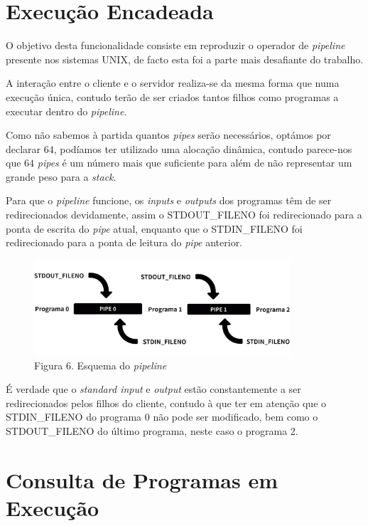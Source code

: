 \documentclass[12pt,a4paper]{report}
\begin{document}
    \section{Execução Encadeada}

        O objetivo desta funcionalidade consiste em reproduzir o operador de \textit{pipeline} presente nos sistemas UNIX, de facto esta foi a parte mais desafiante do trabalho.

        A interação entre o cliente e o servidor realiza-se da mesma forma que numa execução única, contudo terão de ser criados tantos filhos como programas a executar dentro do \textit{pipeline}.

        Como não sabemos à partida quantos \textit{pipes} serão necessários, optámos por declarar $64$, podíamos ter utilizado uma alocação dinâmica, contudo parece-nos que $64$ \textit{pipes} é um número mais que suficiente para além de não representar um grande peso para a \textit{stack}.

        Para que o \textit{pipeline} funcione, os \textit{inputs} e \textit{outputs} dos programas têm de ser redirecionados devidamente, assim o STDOUT\_FILENO foi redirecionado para a ponta de escrita do \textit{pipe} atual, enquanto que o STDIN\_FILENO foi redirecionado para a ponta de leitura do \textit{pipe} anterior.

        \begin{figure}[hb!]
            \centering
            \includegraphics[width=0.85\textwidth]{images/pipeline.png}
            \caption*{Figura 6. Esquema do \textit{pipeline}}
            \label{fig:PIPE}
        \end{figure}

        É verdade que o \textit{standard input} e \textit{output} estão constantemente a ser redirecionados pelos filhos do cliente, contudo à que ter em atenção que o STDIN\_FILENO do programa $0$ não pode ser modificado, bem como o STDOUT\_FILENO do último programa, neste caso o programa 2.

    \section{Consulta de Programas em Execução}
\end{document}
